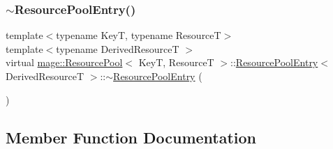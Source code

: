 \hypertarget{structmage_1_1_resource_pool_1_1_resource_pool_entry_ae8d7b54f633fb865e2c299d2fd2bf466}{}\label{structmage_1_1_resource_pool_1_1_resource_pool_entry_ae8d7b54f633fb865e2c299d2fd2bf466} 
\subsubsection{\texorpdfstring{$\sim$\+Resource\+Pool\+Entry()}{~ResourcePoolEntry()}}
{\footnotesize\ttfamily template$<$typename KeyT, typename ResourceT$>$ \\
template$<$typename Derived\+ResourceT $>$ \\
virtual \hyperlink{classmage_1_1_resource_pool}{mage\+::\+Resource\+Pool}$<$ KeyT, ResourceT $>$\+::\hyperlink{structmage_1_1_resource_pool_1_1_resource_pool_entry}{Resource\+Pool\+Entry}$<$ Derived\+ResourceT $>$\+::$\sim$\hyperlink{structmage_1_1_resource_pool_1_1_resource_pool_entry}{Resource\+Pool\+Entry} (\begin{DoxyParamCaption}{ }\end{DoxyParamCaption})\hspace{0.3cm}{\ttfamily [virtual]}}



\subsection{Member Function Documentation}
\hypertarget{structmage_1_1_resource_pool_1_1_resource_pool_entry_a2a08bf48f2dce191a23f088530879ca0}{}\label{structmage_1_1_resource_pool_1_1_resource_pool_entry_a2a08bf48f2dce191a23f088530879ca0} 
